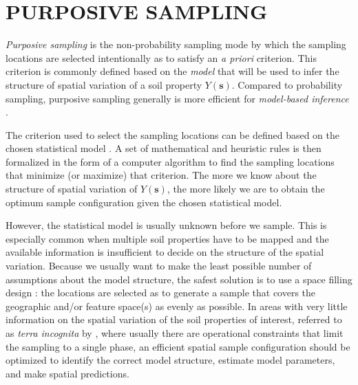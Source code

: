 
\section{PURPOSIVE SAMPLING}

\emph{Purposive sampling} is the non-probability sampling mode by which the sampling locations are selected 
intentionally as to satisfy an \textit{a priori} criterion. This criterion is commonly defined based on the 
\emph{model} that will be used to infer the structure of spatial variation of a soil property 
$Y(\boldsymbol{s})$. Compared to probability sampling, purposive sampling generally is more efficient for 
\emph{model-based inference} \cite{deGruijterEtAl2006}.

The criterion used to select the sampling locations can be defined based on the chosen statistical model 
\cite{deGruijterEtAl2006, Mueller2007, WebsterEtAl2013}. A set of mathematical and heuristic rules is then 
formalized in the form of a computer algorithm to find the sampling locations that minimize (or maximize) that 
criterion. The more we know about the structure of spatial variation of $Y(\boldsymbol{s})$, the more likely we
are to obtain the optimum sample configuration given the chosen statistical model.

However, the statistical model is usually unknown before we sample. This is especially common when multiple 
soil properties have to be mapped and the available information is insufficient to decide on the structure of 
the spatial variation. Because we usually want to make the least possible number of assumptions about the model
structure, the safest solution is to use a space filling design \cite{HenglEtAl2003a, deGruijterEtAl2006, 
Mueller2007, WalvoortEtAl2010}: the locations are selected as to generate a sample that covers the geographic 
and/or feature space(s) as evenly as possible. In areas with very little information on the spatial variation 
of the soil properties of interest, referred to as \emph{terra incognita} by \citet{WebsterEtAl2007}, where 
usually there are operational constraints that limit the sampling to a single phase, an efficient spatial 
sample configuration should be optimized to identify the correct model structure, estimate model parameters, 
and make spatial predictions.

